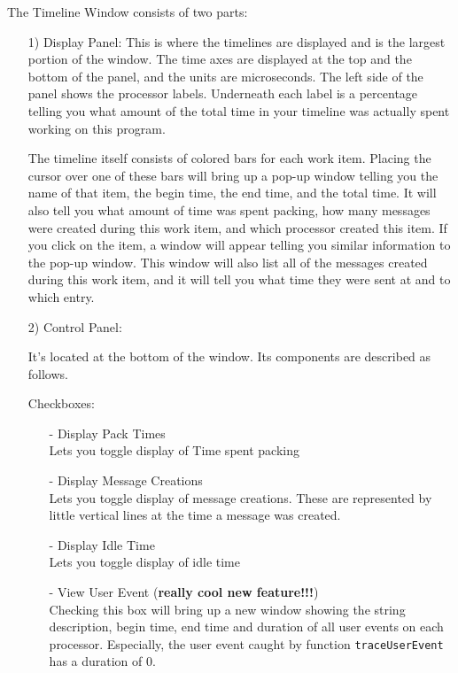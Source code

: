 \documentclass[10pt,dvips]{article}
\begin{document}
   The Timeline Window consists of two parts:
   \begin{enumerate}
   \item[1)]
      Display Panel:
      This is where the timelines are displayed and is the largest portion of
      the window.  The time axes are displayed at the top and the bottom of the
      panel, and the units are microseconds.  The left side of the panel shows
      the processor labels.  Underneath each label is a percentage telling you
      what amount of the total time in your timeline was actually spent working
      on this program.

      The timeline itself consists of colored bars for each
      work item.  Placing the cursor over one of these bars will bring up a
      pop-up window telling you the name of that item, the begin time, the end
      time, and the total time.  It will also tell you what amount of time was
      spent packing, how many messages were created during this work item, and
      which processor created this item.  If you click on the item, a window
      will appear telling you similar information to the pop-up window.  This
      window will also list all of the messages created during this work item,
      and it will tell you what time they were sent at and to which entry.

   \item[2)]
      Control Panel:

	It's located at the bottom of the window. Its components are described
	as follows.

      Checkboxes:
      \begin{itemize}
      \item[-]
        Display Pack Times\\
        Lets you toggle display of Time spent packing
      \item[-]
        Display Message Creations\\
        Lets you toggle display of message creations. These are represented
        by little vertical lines at the time a message was created.
      \item[-]
	Display Idle Time\\
        Lets you toggle display of idle time
      \item[-]
        View User Event ({\bf really cool new feature!!!})\\
	Checking this box will bring up a new window showing the string description,
	begin time, end time and duration of all user events on each processor.
	Especially, the user event caught by function {\tt traceUserEvent} has
	a duration of 0.


\end{itemize}
\end{enumerate}
\end{document}
